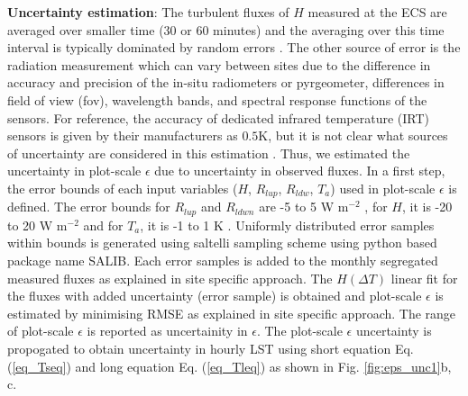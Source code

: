 \documentclass[fleqn,10pt]{wlscirep}
\begin{document}
{\textbf{Uncertainty estimation}:
The turbulent fluxes of $H$ measured at the ECS are averaged over smaller time (30 or 60 minutes) and the averaging over this time interval is typically dominated by random errors \cite{rannik2016random, mauder2020surface}. The other source of error is the radiation measurement which can vary between sites due to the difference in accuracy and precision of the in-situ radiometers or pyrgeometer, differences in field of view (fov), wavelength bands, and spectral response functions of the sensors. For reference, the accuracy of dedicated infrared temperature (IRT) sensors is given by their manufacturers as $0.5$K, but it is not clear what sources of uncertainty are considered in this estimation \cite{vickers2010uncertainty}. Thus, we estimated the uncertainty in plot-scale $\epsilon$ due to uncertainty in observed fluxes. In a first step, the error bounds of each input variables ($ H$, $R_{lup}$, $R_{ldw}$, $T_{a}$) used in plot-scale $\epsilon$ is defined. The error bounds for $R_{lup}$ and $R_{ldwn}$ are -5 to 5 W m$^{-2}$ \cite{trenberth2012tracking}, for $H$, it is -20 to 20 W m$^{-2}$ and for $T_{a}$, it is -1 to 1 K \cite{foken2008energy}. Uniformly distributed error samples within bounds is generated using saltelli sampling scheme\cite{saltelli2017new} using python based package name SALIB. Each error samples is added to the monthly segregated measured fluxes as explained in site specific approach. The $H(\Delta T)$ linear fit for the fluxes with added uncertainty (error sample) is obtained and plot-scale $\epsilon$ is estimated by minimising RMSE as explained in site specific approach. The range of plot-scale $\epsilon$ is reported as uncertainity in $\epsilon$. The plot-scale $\epsilon$ uncertainty is propogated to obtain uncertainty in hourly LST using short equation Eq. (\ref{eq_Tseq}) and long equation Eq. (\ref{eq_Tleq}) as shown in Fig. \ref{fig:eps_unc1}b, c. 

}
\end{document}
